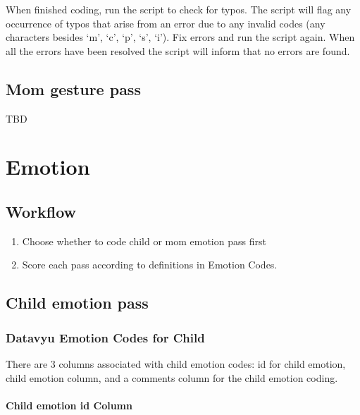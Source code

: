 \documentclass[
  12pt,
]{book}
\providecommand{\tightlist}{%
  \setlength{\itemsep}{0pt}\setlength{\parskip}{0pt}}
\begin{document}
When finished coding, run the script to check for typos. The script will flag any occurrence of typos that arise from an error due to any invalid codes (any characters besides `m', `c', `p', `s', `i'). Fix errors and run the script again. When all the errors have been resolved the script will inform that no errors are found.

\hypertarget{mom-gesture-pass}{%
\section{Mom gesture pass}\label{mom-gesture-pass}}

TBD

\hypertarget{emotion}{%
\chapter{Emotion}\label{emotion}}

\hypertarget{workflow-2}{%
\section{Workflow}\label{workflow-2}}

\begin{enumerate}
\def\labelenumi{\arabic{enumi}.}
\tightlist
\item
  Choose whether to code child or mom emotion pass first
\item
  Score each pass according to definitions in Emotion Codes.
\end{enumerate}

\hypertarget{child-emotion-pass}{%
\section{Child emotion pass}\label{child-emotion-pass}}

\hypertarget{datavyu-emotion-codes-for-child}{%
\subsection{Datavyu Emotion Codes for Child}\label{datavyu-emotion-codes-for-child}}

There are 3 columns associated with child emotion codes: id for child emotion, child emotion column, and a comments column for the child emotion coding.

\hypertarget{child-emotion-id-column}{%
\subsubsection*{Child emotion id Column}\label{child-emotion-id-column}}
\end{document}
